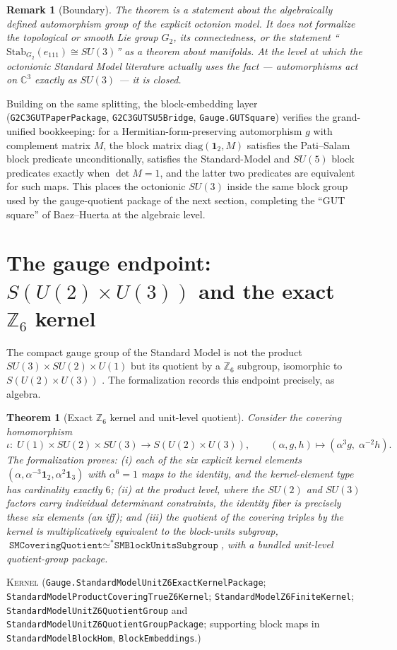 \documentclass[11pt]{article}
\newcommand{\id}{\mathbf{1}}
\newcommand{\C}{\mathbb{C}}
\newcommand{\Kernel}{\textcolor{kernelcolor}{\textsc{Kernel}}}
\newcommand{\leanname}[1]{\texttt{#1}}
\newtheorem{theorem}{Theorem}
\newtheorem{remark}{Remark}
\begin{document}
\begin{remark}[Boundary]
The theorem is a statement about the algebraically defined automorphism
group of the explicit octonion model.  It does not formalize the
topological or smooth Lie group $G_2$, its connectedness, or the
statement ``$\mathrm{Stab}_{G_2}(e_{111}) \cong SU(3)$'' as a theorem
about manifolds.  At the level at which the octonionic Standard Model
literature actually uses the fact --- automorphisms act on
$\C^3$ exactly as $SU(3)$ --- it is closed.
\end{remark}

Building on the same splitting, the block-embedding layer
(\leanname{G2C3GUTPaperPackage}, \leanname{G2C3GUTSU5Bridge},
\leanname{Gauge.GUTSquare}) verifies the grand-unified bookkeeping: for a
Hermitian-form-preserving automorphism $g$ with complement matrix $M$,
the block matrix $\mathrm{diag}(\id_2, M)$ satisfies the Pati--Salam
block predicate unconditionally, satisfies the Standard-Model and
$SU(5)$ block predicates exactly when $\det M = 1$, and the latter two
predicates are equivalent for such maps.  This places the octonionic
$SU(3)$ inside the same block group used by the gauge-quotient package of
the next section, completing the ``GUT square'' of
Baez--Huerta \cite{BaezHuerta2009} at the algebraic level.

\section{The gauge endpoint: $S(U(2)\times U(3))$ and the exact
$\mathbb{Z}_6$ kernel}
\label{sec:gauge}

The compact gauge group of the Standard Model is not the product
$SU(3)\times SU(2)\times U(1)$ but its quotient by a $\mathbb{Z}_6$
subgroup, isomorphic to $S(U(2)\times U(3))$
\cite{BaezHuerta2009}.  The formalization records this endpoint
precisely, as algebra.

\begin{theorem}[Exact $\mathbb{Z}_6$ kernel and unit-level quotient]
\label{thm:z6}
Consider the covering homomorphism
\[
\iota:\; U(1)\times SU(2)\times SU(3) \longrightarrow S(U(2)\times U(3)),
\qquad
(\alpha, g, h) \longmapsto (\alpha^3 g,\; \alpha^{-2} h).
\]
The formalization proves: (i) each of the six explicit kernel elements
$(\alpha, \alpha^{-3}\id_2, \alpha^{2}\id_3)$ with $\alpha^6 = 1$ maps to
the identity, and the kernel-element type has cardinality exactly $6$;
(ii) at the product level, where the $SU(2)$ and $SU(3)$ factors carry
individual determinant constraints, the identity fiber is
\emph{precisely} these six elements (an iff); and (iii) the quotient of
the covering triples by the kernel is multiplicatively equivalent to the
block-units subgroup,
$\leanname{SMCoveringQuotient} \simeq^* \leanname{SMBlockUnitsSubgroup}$,
with a bundled unit-level quotient-group package.
\end{theorem}
\noindent\Kernel{}\quad
(\leanname{Gauge.StandardModelUnitZ6ExactKernelPackage};
\leanname{StandardModelProductCoveringTrueZ6Kernel};
\leanname{StandardModelZ6FiniteKernel};
\leanname{StandardModelUnitZ6QuotientGroup} and
\leanname{StandardModelUnitZ6QuotientGroupPackage};
supporting block maps in \leanname{StandardModelBlockHom},
\leanname{BlockEmbeddings}.)
\end{document}
